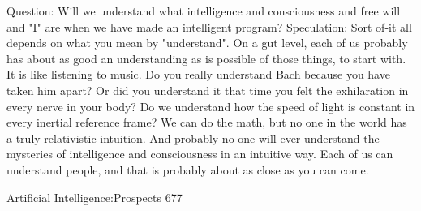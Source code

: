 Question: Will we understand what intelligence and consciousness and free will and "I"
  are when we have made an intelligent program?
  Speculation: Sort of-it all depends on what you mean by "understand". On a gut level,
     each of us probably has about as good an understanding as is possible of those
     things, to start with. It is like listening to music. Do you really understand Bach
     because you have taken him apart? Or did you understand it that time you felt the
     exhilaration in every nerve in your body? Do we understand how the speed of light
     is constant in every inertial reference frame? We can do the math, but no one in the
     world has a truly relativistic intuition. And probably no one will ever understand
     the mysteries of intelligence and consciousness in an intuitive way. Each of us can
     understand people, and that is probably about as close as you can come.




Artificial Intelligence:Prospects                                                    677

